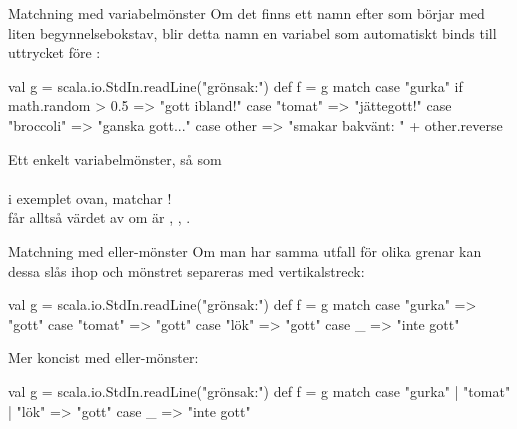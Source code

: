 \begin{Slide}{Matchning med variabelmönster}\SlideFontSmall
Om det finns ett namn efter  som börjar med liten begynnelsebokstav, blir detta namn en variabel som automatiskt binds till uttrycket före :

\begin{Code}
val g = scala.io.StdIn.readLine("grönsak:")
def f = g match {
  case "gurka" if math.random > 0.5 => "gott ibland!"
  case "tomat" => "jättegott!"
  case "broccoli" => "ganska gott..."
  case other => "smakar bakvänt: " + other.reverse
}
\end{Code}

Ett enkelt variabelmönster, så som \\  \\ i exemplet ovan, matchar ! \\ får alltså värdet av  om   är , , .

\end{Slide}


\begin{Slide}{Matchning med eller-mönster}\SlideFontSmall
Om man har samma utfall för olika grenar kan dessa slås ihop och mönstret separeras med vertikalstreck: \code{|}
\begin{Code}
val g = scala.io.StdIn.readLine("grönsak:")
def f = g match {
  case "gurka" => "gott"
  case "tomat" => "gott"
  case "lök"   => "gott"
  case _ => "inte gott"
}
\end{Code}

Mer koncist med eller-mönster:

\begin{Code}
val g = scala.io.StdIn.readLine("grönsak:")
def f = g match {
  case "gurka" | "tomat" | "lök" => "gott"
  case _ => "inte gott"
}
\end{Code}



\end{Slide}





